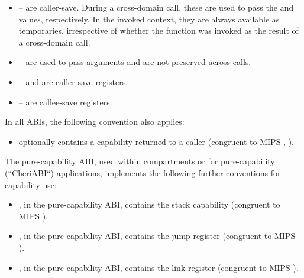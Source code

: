 \begin{itemize}
	\item {}-- are caller-save.  During a cross-domain call, these are used to pass the \PCC{} and \IDC{} values, respectively.  In the invoked context, they are always available as temporaries, irrespective of whether the function was invoked as the result of a cross-domain call.
	\item {}-- are used to pass arguments and are not preserved across calls.
	\item {}-- and  are caller-save registers.
	\item {}-- are callee-save registers.
\end{itemize}

\noindent
In all ABIs, the following convention also applies:

\begin{itemize}
\item {} optionally contains a capability returned to a caller
  (congruent to MIPS , ).
\end{itemize}

\noindent
The pure-capability ABI, used within compartments or for pure-capability
(``CheriABI``) applications, implements the following further conventions for
capability use:

\begin{itemize}
\item {}, in the pure-capability ABI, contains the stack capability
  (congruent to MIPS ).
\item {}, in the pure-capability ABI, contains the jump register
  (congruent to MIPS ).
\item {}, in the pure-capability ABI, contains the link register
  (congruent to MIPS ).
\end{itemize}

